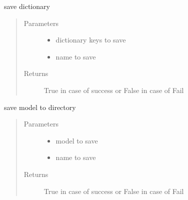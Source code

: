 \documentclass[letterpaper,10pt,english]{sphinxmanual}
\begin{document}

\begin{fulllineitems}
\label{\detokenize{algorithms:repository.repository_service.save_dic}}
\sphinxAtStartPar
save dictionary
\begin{quote}\begin{description}
\item[{Parameters}] \leavevmode\begin{itemize}
\item {} 
\sphinxAtStartPar
{} \textendash{} dictionary keys to save

\item {} 
\sphinxAtStartPar
{} \textendash{} name to save

\end{itemize}

\item[{Returns}] \leavevmode
\sphinxAtStartPar
True in case of success or False in case of Fail

\end{description}\end{quote}

\end{fulllineitems}


\begin{fulllineitems}
\label{\detokenize{algorithms:repository.repository_service.save_model}}
\sphinxAtStartPar
save model to directory
\begin{quote}\begin{description}
\item[{Parameters}] \leavevmode\begin{itemize}
\item {} 
\sphinxAtStartPar
{} \textendash{} model to save

\item {} 
\sphinxAtStartPar
{} \textendash{} name to save

\end{itemize}

\item[{Returns}] \leavevmode
\sphinxAtStartPar
True in case of success or False in case of Fail

\end{description}\end{quote}

\end{fulllineitems}
\end{document}
